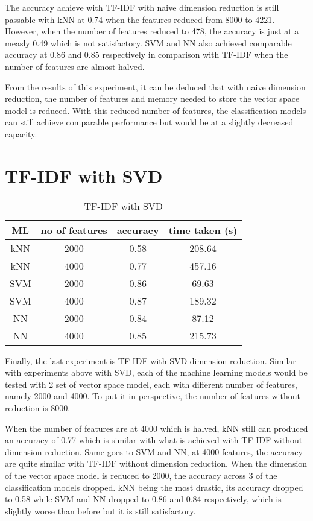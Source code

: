 The accuracy achieve with TF-IDF with naive dimension reduction is still passable with kNN at 0.74 when the features reduced from 8000 to 4221. However, when the number of features reduced to 478, the accuracy is just at a measly 0.49 which is not satisfactory. SVM and NN also achieved comparable accuracy at 0.86 and 0.85 respectively in comparison with TF-IDF when the number of features are almost halved.

From the results of this experiment, it can be deduced that with naive dimension reduction, the number of features and memory needed to store the vector space model is reduced. With this reduced number of features, the classification models can still achieve comparable performance but would be at a slightly decreased capacity.

\section{TF-IDF with SVD}

\begin{table} [ht]
	\centering
	\begin{tabular}{|| c | c | c | c||}
		\hline
		ML & no of features & accuracy & time taken (s) \\ [0.5ex]
		\hline\hline
		kNN & 2000 & 0.58 & 208.64 \\ 
		\hline
		kNN & 4000 & 0.77 & 457.16 \\
		\hline\hline
		SVM & 2000 & 0.86 & 69.63 \\
		\hline
		SVM & 4000 & 0.87 & 189.32 \\
		\hline\hline
		NN & 2000 & 0.84 & 87.12 \\
		\hline
		NN & 4000 & 0.85 & 215.73 \\
		\hline
	\end{tabular}
\caption{TF-IDF with SVD}
\label{tbl:tfidfSvd}
\end{table}

Finally, the last experiment is TF-IDF with SVD dimension reduction. Similar with experiments above with SVD, each of the machine learning models would be tested with 2 set of vector space model, each with different number of features, namely 2000 and 4000. To put it in perspective, the number of features without reduction is 8000. 

When the number of features are at 4000 which is halved, kNN still can produced an accuracy of 0.77 which is similar with what is achieved with TF-IDF without dimension reduction. Same goes to SVM and NN, at 4000 features, the accuracy are quite similar with TF-IDF without dimension reduction. When the dimension of the vector space model is reduced to 2000, the accuracy across 3 of the classification models dropped. kNN being the most drastic, its accuracy dropped to 0.58 while SVM and NN dropped to 0.86 and 0.84 respectively, which is slightly worse than before but it is still satisfactory. 

